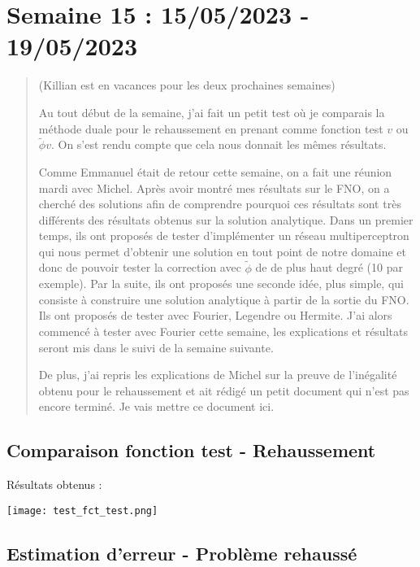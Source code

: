 \section{Semaine 15 : 15/05/2023 - 19/05/2023}
\graphicspath{{semaines/semaine_15/images/}}

\setcounter{equation}{0}

\begin{abstract}
	(Killian est en vacances pour les deux prochaines semaines)
	
	Au tout début de la semaine, j'ai fait un petit test où je comparais la méthode duale pour le rehaussement en prenant comme fonction test $v$ ou $\tilde{\phi}v$. On s'est rendu compte que cela nous donnait les mêmes résultats.
	
	Comme Emmanuel était de retour cette semaine, on a fait une réunion mardi avec Michel. Après avoir montré mes résultats sur le FNO, on a cherché des solutions afin de comprendre pourquoi ces résultats sont très différents des résultats obtenus sur la solution analytique. Dans un premier temps, ils ont proposés de tester d'implémenter un réseau multiperceptron qui nous permet d'obtenir une solution en tout point de notre domaine et donc de pouvoir tester la correction avec $\tilde{\phi}$ de de plus haut degré (10 par exemple). Par la suite, ils ont proposés une seconde idée, plus simple, qui consiste à construire une solution analytique à partir de la sortie du FNO. Ils ont proposés de tester avec Fourier, Legendre ou Hermite. J'ai alors commencé à tester avec Fourier cette semaine, les explications et résultats seront mis dans le suivi de la semaine suivante. 
	
	De plus, j'ai repris les explications de Michel sur la preuve de l'inégalité obtenu pour le rehaussement et ait rédigé un petit document qui n'est pas encore terminé. Je vais mettre ce document ici.  
\end{abstract}

\subsection{Comparaison fonction test - Rehaussement}

Résultats obtenus :

\begin{minipage}{\linewidth}
	\centering
	\texttt{[image: test\_fct\_test.png]}
\end{minipage}

\subsection{Estimation d'erreur - Problème rehaussé \faBookmarkO}


